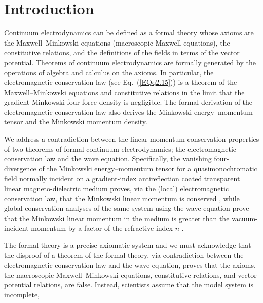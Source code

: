 \documentclass[twocolumn,amssymb,eqsecnum,aps,pra]{revtex4-2}
\begin{document}
\section{Introduction}
\par
Continuum electrodynamics can be defined as a formal theory 
whose axioms are the Maxwell--Minkowski equations (macroscopic Maxwell
equations), the constitutive relations, and the definitions of the 
fields in terms of the vector potential.
Theorems of continuum electrodynamics are formally generated by the
operations of algebra and calculus on the axioms.
In particular, the electromagnetic conservation law 
(see Eq.~(\ref{EQq2.15})) is a theorem of the Maxwell--Minkowski
equations and constitutive relations in the limit that the gradient
Minkowski four-force density is negligible.
The formal derivation of the electromagnetic conservation law
also derives the Minkowski energy--momentum tensor and the Minkowski
momentum density.
\par
We address a contradiction between the linear momentum
conservation properties of two theorems of formal continuum
electrodynamics; the electromagnetic conservation law and the wave
equation.
Specifically, the vanishing four-divergence of the Minkowski 
energy--momentum tensor for a quasimonochromatic field normally
incident on a gradient-index antireflection coated transparent linear
magneto-dielectric medium proves, via the (local) electromagnetic
conservation law, that the Minkowski linear momentum is
conserved \cite{BIPfei,BIBrevCons,BIBrevVec,BIBrevik,BIWang4Vec},
while global conservation analyses of the same system using the wave
equation prove that the Minkowski linear momentum in the medium
is greater than the vacuum-incident momentum by a factor of the
refractive index $n$ \cite{BIPfei,BIGord,BIFofn1,BIFofn2}.
\par
The formal theory is a precise axiomatic system and we must
acknowledge that the disproof of a theorem of the formal theory,
via contradiction between the electromagnetic conservation law and
the wave equation, proves that the axioms, the macroscopic
Maxwell--Minkowski equations, constitutive relations, and
vector potential relations, are false.
Instead, scientists assume that the model system is incomplete,
\end{document}
